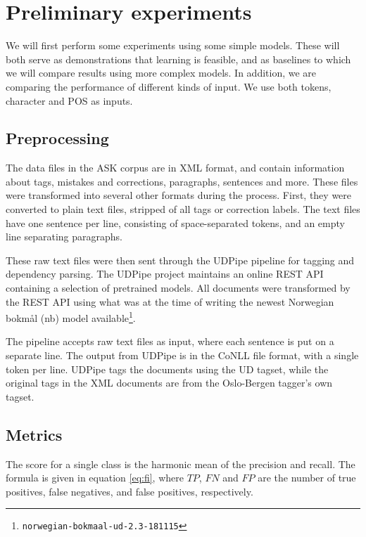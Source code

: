 \chapter{Preliminary experiments}

We will first perform some experiments using some simple models. These will
both serve as demonstrations that learning is feasible, and as baselines
to which we will compare results using more complex models. In addition,
we are comparing the performance of different kinds of input. We use both
tokens, character \ngrams and \ac{POS} \ngrams as inputs.


\section{Preprocessing}

The data files in the ASK corpus are in \ac{XML} format, and contain information
about tags, mistakes and corrections, paragraphs, sentences and more. These
files were transformed into several other formats during the process. First,
they were converted to plain text files, stripped of all tags or correction
labels. The text files have one sentence per line, consisting of
space-separated tokens, and an empty line separating paragraphs.

These raw text files were then sent through the UDPipe pipeline
\autocite{udpipe:2017} for tagging and dependency parsing. The UDPipe project
maintains an online REST \ac{API} containing a selection of pretrained models.
All documents were transformed by the REST \ac{API} using what was at
the time of writing the newest Norwegian bokmål (nb) model
available\footnote{\texttt{norwegian-bokmaal-ud-2.3-181115}}.

The pipeline accepts raw text files as input, where each sentence is put on a
separate line. The output from UDPipe is in the CoNLL file format, with a
single token per line. UDPipe tags the documents using the UD tagset, while
the original tags in the \ac{XML} documents are from the Oslo-Bergen tagger's own
tagset.


\section{Metrics}

The \FI score for a single class is the harmonic mean of the precision and
recall. The formula is given in equation \ref{eq:fi}, where $TP$, $FN$ and
$FP$ are the number of true positives, false negatives, and false positives,
respectively.


